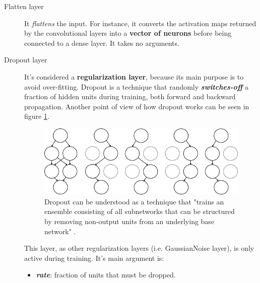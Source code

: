 \begin{description}
	\item[Flatten layer] It \textit{flattens} the input. For instance, it converts the activation maps returned by the convolutional layers into a \textbf{vector of neurons} before being connected to a dense layer. It takes no arguments.
\end{description}

\begin{description}
	\item[Dropout layer] It's considered a \textbf{regularization layer}, because its main purpose is to avoid over-fitting. Dropout \cite{Srivastava-et-al-2014} is a technique that randomly \textbf{\textit{switches-off}} a fraction of hidden units during training, both forward and backward propagation. Another point of view of how dropout works can be seen in figure \ref{fig:dropout}.

	\begin{figure}
		\centering
		\includegraphics[width=1\linewidth, keepaspectratio]{figures/dropout.png}
		\caption[Subnetworks generated when using dropout]{Dropout can be understood as a technique that "trains an ensemble consisting of all subnetworks that can be structured by removing non-output units from an underlying base network" \cite{Goodfellow-et-al-2016}.}
		\label{fig:dropout}
	\end{figure}	

	 This layer, as other regularization layers (i.e. GaussianNoise layer), is only active during training. It's main argument is:
	\begin{itemize}
		\item \textbf{\textit{rate}}: fraction of units that must be dropped.
	\end{itemize}
	
\end{description}


